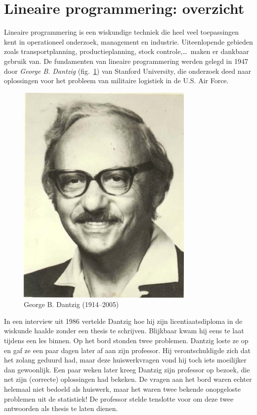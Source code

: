 \section{Lineaire programmering: overzicht}
Lineaire programmering is een wiskundige techniek die heel veel
toepassingen kent in operationeel onderzoek, management en industrie.
Uiteenlopende gebieden zoals transportplanning, productieplanning,
stock controle,\ldots \ maken er dankbaar gebruik van. De fundamenten
van lineaire programmering werden gelegd in 1947 door \emph{George
B. Dantzig} (fig.~\ref{fig:dantzig}) van Stanford University, die onderzoek deed naar oplossingen
voor het probleem van militaire logistiek in de U.S. Air Force.
\begin{figure}[htbp]
    \centering
\includegraphics[scale=0.5]{figuren/lp/dantzig.jpg} 
     \caption{George B. Dantzig (1914--2005)}
    \label{fig:dantzig}
\end{figure}
In een interview uit 1986 vertelde Dantzig hoe hij zijn licentiaatsdiploma
in de wiskunde haalde zonder een thesis te schrijven. Blijkbaar
kwam hij eens te laat tijdens een les binnen. Op het bord stonden
twee problemen. Dantzig loste ze op en gaf ze een paar dagen later
af aan zijn professor. Hij verontschuldigde zich dat het zolang
geduurd had, maar deze huiswerkvragen vond hij toch iets moeilijker
dan gewoonlijk. Een paar weken later kreeg Dantzig zijn professor
op bezoek, die net zijn (correcte) oplossingen had bekeken. De
vragen aan het bord waren echter helemaal niet bedoeld als huiswerk,
maar het waren twee bekende onopgeloste problemen uit de statistiek!
De professor stelde tenslotte voor om deze twee antwoorden als
thesis te laten dienen.

